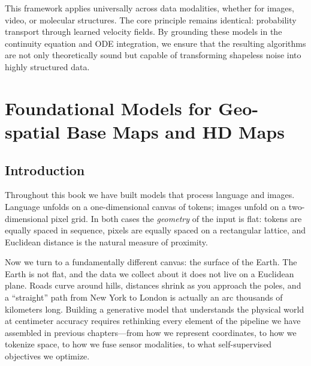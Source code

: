 \documentclass{book}
\begin{document}
This framework applies universally across data modalities, whether for images, video, or molecular structures. The core principle remains identical: probability transport through learned velocity fields. By grounding these models in the continuity equation and ODE integration, we ensure that the resulting algorithms are not only theoretically sound but capable of transforming shapeless noise into highly structured data.



\chapter{Foundational Models for Geo-spatial Base Maps and HD Maps}
\label{ch:geospatial_fm}

\section{Introduction}

Throughout this book we have built models that process language and
images.  Language unfolds on a one-dimensional canvas of tokens;
images unfold on a two-dimensional pixel grid.  In both cases the
\emph{geometry} of the input is flat: tokens are equally spaced in
sequence, pixels are equally spaced on a rectangular lattice, and
Euclidean distance is the natural measure of proximity.

Now we turn to a fundamentally different canvas: the surface of the
Earth.  The Earth is not flat, and the data we collect about it does
not live on a Euclidean plane.  Roads curve around hills, distances
shrink as you approach the poles, and a ``straight'' path from New
York to London is actually an arc thousands of kilometers long.
Building a generative model that understands the physical world at
centimeter accuracy requires rethinking every element of the pipeline
we have assembled in previous chapters---from how we represent
coordinates, to how we tokenize space, to how we fuse sensor
modalities, to what self-supervised objectives we optimize.
\end{document}

